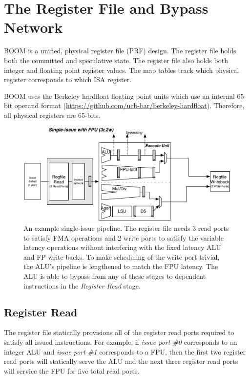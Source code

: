 \chapter{The Register File and Bypass Network}

BOOM is a unified, physical register file (PRF) design. The register file holds both the committed and speculative state. The register file also holds both integer and floating point register values. The map tables track which physical register corresponds to which ISA register. 

BOOM uses the Berkeley hardfloat floating point units which use an internal 65-bit operand format (\url{https://github.com/ucb-bar/berkeley-hardfloat}).  Therefore, all physical registers are 65-bits.



\begin{figure}[htb]
	\centering
	\centerline{\includegraphics[scale =0.8] {figures/1w-rrd-bypass-pipeline}}
	\caption{ \small An example single-issue pipeline. The register file needs 3 read ports to satisfy FMA operations and 2 write ports to satisfy the variable latency operations without interfering with the fixed latency ALU and FP write-backs. To make scheduling of the write port trivial, the ALU's pipeline is lengthened to match the FPU latency.  The ALU is able to bypass from any of these stages to dependent instructions in the {\em Register Read} stage. }
	\label{fig:1w-rrd-bypass-pipeline}
\end{figure}


\section{Register Read}

The register file statically provisions all of the register read ports required to satisfy all issued instructions. For example, if {\em issue port \#0} corresponds to an integer ALU and {\em issue port \#1} corresponds to a FPU, then the first two register read ports will statically serve the ALU and the next three register read ports will service the FPU for five total read ports. 

